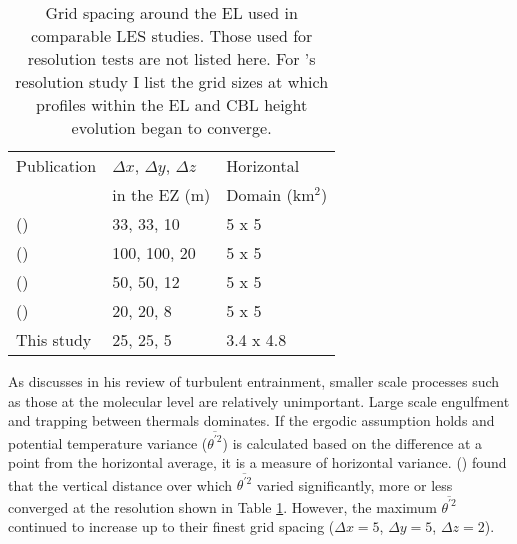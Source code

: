 \begin{table}[htbp]
\caption[Comparison of Grid-Sizes used in similar Studies]{Grid spacing around the \acs{EL} used in comparable \acs{LES} studies. Those used for resolution tests are not listed here.  For \citeauthor{SullPat}'s \citeyear{SullPat} resolution study I list the grid sizes at which profiles within the \acs{EL} and \acs{CBL} height evolution began to converge.}

    \begin{center}
    \begin{tabular}{ p{5cm} p{3cm} p{3cm}}
Publication & $\Delta x$, $\Delta y$, $\Delta z$ & Horizontal \\
 & in the \acs{EZ} (m) & Domain (km$^{2}$) \\ \hline
      \citeauthor{SullMoengStev} (\citeyear{SullMoengStev}) & 33, 33, 10 & 5 x 5 \\ %
      \citeauthor{FedConzMir04} (\citeyear{FedConzMir04}) & 100, 100, 20 & 5 x 5 \\ [.3cm] %
      \citeauthor{BrooksFowler2} (\citeyear{BrooksFowler2}) & 50, 50, 12 & 5 x 5 \\%
      \citeauthor{SullPat} (\citeyear{SullPat}) &  20, 20, 8 & 5 x 5\\ %
      This study & 25, 25, 5 &  3.4 x 4.8\\ \hline       
    \end{tabular}
\label{table:gridcomp}   
\end{center}    
\end{table}


As \citeauthor{Turner86} discusses in his \citeyear{Turner86} review of turbulent entrainment, smaller scale processes such as those at the molecular level are relatively unimportant.  Large scale engulfment and trapping between thermals dominates.  If the ergodic assumption holds and potential temperature variance ($\overline{\theta^{'2}}$) is calculated based on the difference at a point from the horizontal average, it is a measure of horizontal variance.  \citeauthor{SullPat} (\citeyear{SullPat}) found that the vertical distance over which $\overline{\theta^{'2}}$ varied significantly, more or less converged at the resolution shown in Table \ref{table:gridcomp}.  However, the maximum $\overline{\theta^{'2}}$ continued to increase up to their finest grid spacing ($\Delta x=5$, $\Delta y = 5$, $\Delta z = 2$).\\

